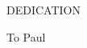 \newpage

\begin{center}
DEDICATION
\end{center}


\begin{center}
\vspace{4cm}
To Paul
\end{center}
